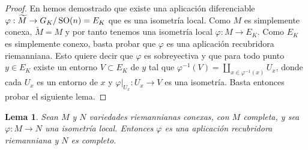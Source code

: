 \documentclass[11pt,a4paper]{amsbook}
\newtheorem{lemma}[subsection]{Lema}
\theoremstyle{remark} \newtheorem{rmk}[subsection]{Observación}
\theoremstyle{definition} \newtheorem{defn}[subsection]{Definición}
\theoremstyle{definition} \newtheorem{ex}[subsection]{Ejemplo}
\theoremstyle{definition} \newtheorem{ej}[subsection]{Ejercicio}
\begin{document}
\begin{proof}
  En  hemos demostrado que existe una aplicación diferenciable $\varphi:\widetilde{M}\rightarrow G_K/\operatorname{SO}(n)=E_K$ que es una isometría local. Como $M$ es simplemente conexa, $\widetilde{M}=M$ y por tanto tenemos una isometría local $\varphi:M\rightarrow E_K$. Como $E_K$ es simplemente conexo, basta probar que $\varphi$ es una aplicación recubridora riemanniana. Esto quiere decir que $\varphi$ es sobreyectiva y que para todo punto $y \in E_K$ existe un entorno $V \subset E_K$ de $y$ tal que $\varphi^{-1}(V)=\coprod_{x \in \varphi^{-1}(x)} U_x$, donde cada $U_x$ es un entorno de $x$ y $\varphi|_{U_x}:U_x \rightarrow V$ es una isometría. Basta entonces probar el siguiente lema.
\end{proof}

\begin{lemma}
Sean $M$ y $N$ variedades riemannianas conexas, con $M$ completa, y sea $\varphi:M\rightarrow N$ una isometría local. Entonces $\varphi$ es una aplicación recubridora riemanniana y $N$ es completo.
\end{lemma}
\end{document}
